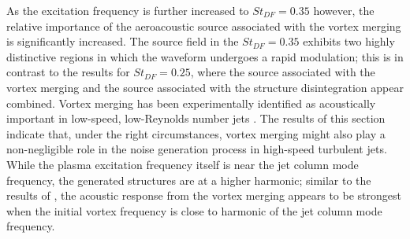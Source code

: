 As the excitation frequency is further increased to $St_{DF} = 0.35$ however, the relative importance of the aeroacoustic source associated with the vortex merging is significantly increased.
The source field in the $St_{DF} = 0.35$ exhibits two highly distinctive regions in which the waveform undergoes a rapid modulation; this is in contrast to the results for $St_{DF} = 0.25$, where the source associated with the vortex merging and the source associated with the structure disintegration appear combined.
Vortex merging has been experimentally identified as acoustically important in low-speed, low-Reynolds number jets \citep{Kibens1980}.
The results of this section indicate that, under the right circumstances, vortex merging might also play a non-negligible role in the noise generation process in high-speed turbulent jets.
While the plasma excitation frequency itself is near the jet column mode frequency, the generated structures are at a higher harmonic; similar to the results of \citet{Kibens1980}, the acoustic response from the vortex merging appears to be strongest when the initial vortex frequency is close to harmonic of the jet column mode frequency.